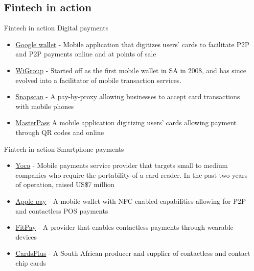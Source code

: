 \documentclass[10pt]{beamer}
\begin{document}

\subsection{Fintech in action}

\begin{frame}{Fintech in action}
	Digital payments
	\begin{itemize}
		\item \href{https://www.google.com/wallet/}{Google wallet} - Mobile application that digitizes users' cards to facilitate P2P and P2P payments online and at points of sale
		\item \href{www.wigroupinternational.com}{WiGroup} - Started off as the first mobile wallet in SA in 2008, and has since evolved into a facilitator of mobile transaction services.
		\item \href{http://www.snapscan.co.za}{Snapscan} - A pay-by-proxy allowing businesses to accept card transactions with mobile phones
		\item \href{https://masterpass.com}{MasterPass} A mobile application digitizing users' cards allowing payment through QR codes and online
	\end{itemize}
\end{frame}



\begin{frame}{Fintech in action}
	Smartphone payments
	\begin{itemize}
		\item \href{https://www.yoco.co.za/}{Yoco} - Mobile payments service provider that targets small to medium companies who require the portability of a card reader. In the past two years of operation, raised US\$7 million
		\item \href{https://www.apple.com/apple-pay/}{Apple pay} - A mobile wallet with NFC enabled capabilities allowing for P2P and contactless POS payments
		\item \href{http://www.fit-pay.com}{FitPay} - A provider that enables contactless payments through wearable devices
		\item \href{http://cardsplus.co.za}{CardsPlus} - A South African producer and supplier of contactless and contact chip cards
	\end{itemize}
\end{frame}
\end{document}

